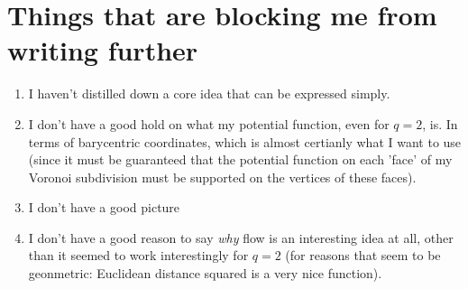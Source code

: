 \section{Things that are blocking me from writing further}
\begin{enumerate}
\item I haven't distilled down a core idea that can be expressed
simply.
\item I don't have a good hold on what my potential function,
  even for $q=2$, is. In terms of barycentric coordinates, which
  is almost certianly what I want to use (since it must be
      guaranteed that the potential function on each 'face' of my
      Voronoi subdivision must be supported on the vertices of
      these faces).
\item I don't have a good picture
\item I don't have a good reason to say \textit{why} flow is an
interesting idea at all, other than it seemed to work
interestingly for $q=2$ (for reasons that seem to be geonmetric:
Euclidean distance squared is a very nice function).
\end{enumerate}
